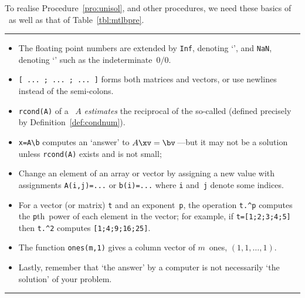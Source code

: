 \begin{table}
\caption{To realise Procedure~\ref{pro:unisol}, and other procedures, we need these basics of \script\ as well as that of Table~\ref{tbl:mtlbpre}.} \label{tbl:mtlbbasics}
\hrule
\begin{minipage}{\linewidth}
\begin{itemize}
\item The floating point numbers are extended by \verb|Inf|, denoting `', and \verb|NaN|, denoting `' such as the indeterminate~\(0/0\).
\item {}\verb|[ ... ; ... ; ... ]| forms both matrices and vectors, or use newlines instead of the semi-colons.
\item {}\verb|rcond(A)|  of a ~\(A\) \emph{estimates} the reciprocal of the so-called  (defined precisely by Definition~\ref{def:condnum}).
\item {}\verb|x=A\b| computes an `answer' to \(A\xv=\bv\)\,---but it may not be a solution unless \verb|rcond(A)| exists and is not small;
\item {}Change an element of an array or vector by assigning a new value with assignments \verb|A(i,j)=...| or \verb|b(i)=...| where \verb|i| and~\verb|j| denote some indices.
\item {}For a vector (or matrix) \verb|t| and an exponent~\verb|p|, the operation \verb|t.^p| computes the \verb|p|th~power of each element in the vector; for example, if \verb|t=[1;2;3;4;5]| then \verb|t.^2| computes \verb|[1;4;9;16;25]|.
\item The function \verb|ones(m,1)| gives a column vector of \(m\)~ones, \((1,1,\ldots,1)\).
\item Lastly, remember that `the answer' by a computer is not necessarily `the solution' of your problem.
\end{itemize}
\end{minipage}
\hrule
\end{table}


